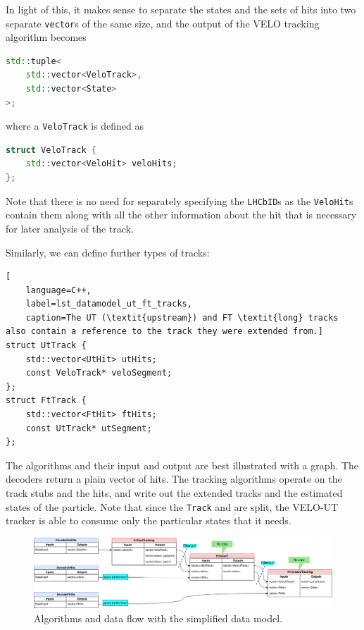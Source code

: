 \documentclass[12pt]{article}
\newcommand{\code}[1]{\texttt{#1}}
\begin{document}
In light of this, it makes sense to separate the states and the sets of hits into two separate \code{vector}s of the same size, and the output of the VELO tracking algorithm becomes
\begin{lstlisting}[language=C++]
std::tuple<
	std::vector<VeloTrack>,
	std::vector<State>
>;
\end{lstlisting}
where a \code{VeloTrack} is defined as 
\begin{lstlisting}[language=C++]
struct VeloTrack {
	std::vector<VeloHit> veloHits;
};
\end{lstlisting}

Note that there is no need for separately specifying the \code{LHCbID}s as the \code{VeloHit}s contain them along with all the other information about the hit that is necessary for later analysis of the track.

\vspace{1pc}

Similarly, we can define further types of tracks:
\begin{lstlisting}[
	language=C++,
	label=lst_datamodel_ut_ft_tracks,
	caption=The UT (\textit{upstream}) and FT \textit{long} tracks also contain a reference to the track they were extended from.]
struct UtTrack {
	std::vector<UtHit> utHits;
	const VeloTrack* veloSegment;
};
struct FtTrack {
	std::vector<FtHit> ftHits;
	const UtTrack* utSegment;
};
\end{lstlisting}

The algorithms and their input and output are best illustrated with a graph. The decoders return a plain vector of hits. The tracking algorithms operate on the track stubs and the hits, and write out the extended tracks and the estimated states of the particle. Note that since the \code{Track} and are split, the VELO-UT tracker is able to consume only the particular states that it needs.

\begin{figure}[H]
	\begin{center}
		\includegraphics[width=1\textwidth]{datamodel_track_flow}
	\end{center}
	\caption{Algorithms and data flow with the simplified data model.}
	\label{fig_datamodel_track_flow}
\end{figure}
\end{document}
